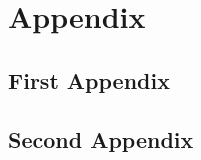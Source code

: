 \appendix

\fancyhead[C]{\small\leftmark}
\cfoot{\thepage}
\chapter{Appendix}
\label{chap:appendix}

\section{First Appendix}
\label{sec:first-appendix}
\clearpage
\section{Second Appendix}
\label{sec:second-appendix}